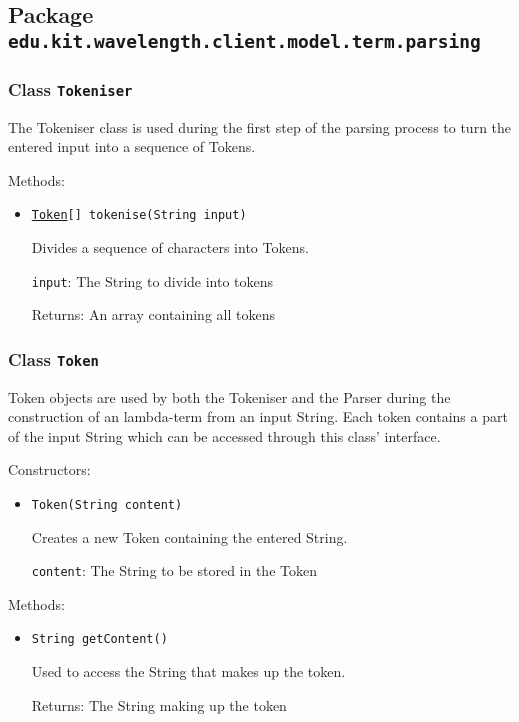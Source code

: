 \subsection{Package \lstinline{edu.kit.wavelength.client.model.term.parsing}}
\label{pkg:edu.kit.wavelength.client.model.term.parsing}


\subsubsection{Class \texttt{Tokeniser}}
\label{type:edu.kit.wavelength.client.model.term.parsing.Tokeniser}
The Tokeniser class is used during the first step of the parsing process to turn the entered input into a sequence of Tokens.

Methods:
\begin{itemize}
\item \texttt{\hyperref[type:edu.kit.wavelength.client.model.term.parsing.Token]{Token}[] tokenise(String input)}

Divides a sequence of characters into Tokens.

\texttt{input}: The String to divide into tokens

Returns: An array containing all tokens

\end{itemize}

\subsubsection{Class \texttt{Token}}
\label{type:edu.kit.wavelength.client.model.term.parsing.Token}
Token objects are used by both the Tokeniser and the Parser during the construction of an lambda-term from an input String.
 Each token contains a part of the input String which can be accessed through this class' interface.

Constructors:
\begin{itemize}
\item \texttt{Token(String content)}

Creates a new Token containing the entered String.

\texttt{content}: The String to be stored in the Token

\end{itemize}

Methods:
\begin{itemize}
\item \texttt{String getContent()}

Used to access the String that makes up the token.

Returns: The String making up the token

\end{itemize}

